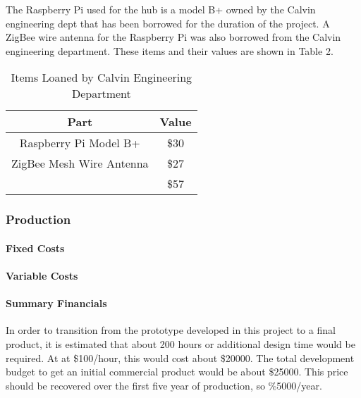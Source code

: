 \documentclass[PPFS.tex]{template/subfiles}
\begin{document}
        The Raspberry Pi used for the hub is a model B+ owned by the Calvin engineering dept that has been borrowed for the duration of the project. A ZigBee wire antenna for the Raspberry Pi was also borrowed from the Calvin engineering department. These items and their values are shown in Table 2.
        
        \begin{table}[h!]
        	\begin{center}
        		\caption{Items Loaned by Calvin Engineering Department}
        		\label{tab:table2}
        		\begin{tabular}{|c|c|}
        			\hline
        			Part & Value\\
        			\hline
        			Raspberry Pi Model B+ & \$30 \\
        			\hline
        			ZigBee Mesh Wire Antenna & \$27 \\
        			\hline
        			& \$57\\
        			\hline
        		\end{tabular}
        	\end{center}
        \end{table}
        \subsubsection{Production}
        \paragraph{Fixed Costs}	%
        \paragraph{Variable Costs}
        \paragraph{Summary Financials}
        
        In order to transition from the prototype developed in this project to a final product, it is estimated that about 200 hours or additional design time would be required. At at \$100/hour, this would cost about \$20000. The total development budget to get an initial commercial product would be about \$25000. This price should be recovered over the first five year of production, so \%5000/year.
        
\end{document}
